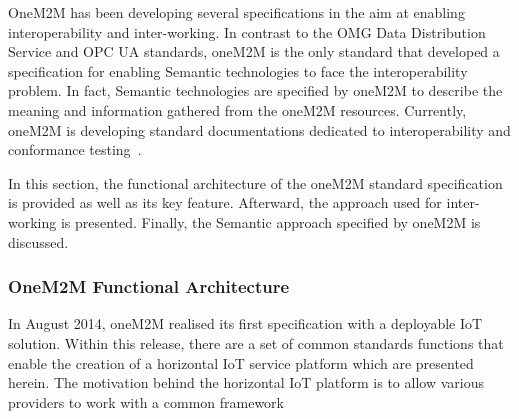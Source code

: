 OneM2M has been developing several specifications in the aim at enabling interoperability and inter-working. In contrast to the OMG Data Distribution Service and OPC UA standards, oneM2M is the only standard that developed a specification for enabling Semantic technologies to face the interoperability problem. In fact, Semantic technologies are specified by oneM2M to describe the meaning and information gathered from the oneM2M resources. Currently, oneM2M is developing standard documentations dedicated to interoperability and conformance testing~\cite{onem2ms}. \par 
In this section, the functional architecture of the oneM2M standard specification is provided as well as its key feature. Afterward, the approach used for inter-working is presented. Finally, the Semantic approach specified by oneM2M is discussed.



\subsubsection{OneM2M Functional Architecture}
In August 2014, oneM2M realised its first specification with a deployable IoT solution. Within this release, there are a set of common standards functions that enable the creation of a horizontal IoT service platform which are presented herein. The motivation behind the horizontal IoT platform is to allow various providers to work with a common framework~\cite{H} \par 

